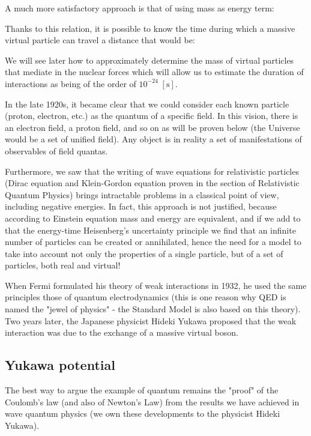 	A much more satisfactory approach is that of using mass as energy term:
	
	Thanks to this relation, it is possible to know the time during which a massive virtual particle can travel a distance that would be:
	
	We will see later how to approximately determine the mass of virtual particles that mediate in the nuclear forces which will allow us to estimate the duration of interactions as being of the order of $10^{-24}\; [\text{s}]$.
	
	In the late 1920s, it became clear that we could consider each known particle (proton, electron, etc.) as the quantum of a specific field. In this vision, there is an electron field, a proton field, and so on as will be proven below (the Universe would be a set of unified field). Any object is in reality a set of manifestations of observables of field quantas.
	
	Furthermore, we saw that the writing of wave equations for relativistic particles (Dirac equation and Klein-Gordon equation proven in the section of Relativistic Quantum Physics) brings intractable problems in a classical point of view, including negative energies. In fact, this approach is not justified, because according to Einstein equation mass and energy are equivalent, and if we add to that the energy-time Heisenberg's uncertainty principle we find that an infinite number of particles can be created or annihilated, hence the need for a model to take into account not only the properties of a single particle, but of a set of particles, both real and virtual!
	\begin{tcolorbox}[title=Remark,colframe=black,arc=10pt]
	When Fermi formulated his theory of weak interactions in 1932, he used the same principles those of quantum electrodynamics (this is one reason why QED is named the "jewel of physics" - the Standard Model is also based on this theory). Two years later, the Japanese physicist Hideki Yukawa proposed that the weak interaction was due to the exchange of a massive virtual boson.
	\end{tcolorbox}
	
	\subsection{Yukawa potential}
	The best way to argue the example of quantum remains the "proof" of the Coulomb's law (and also of Newton's Law) from the results we have achieved in wave quantum physics (we own these developments to the physicist Hideki Yukawa).

